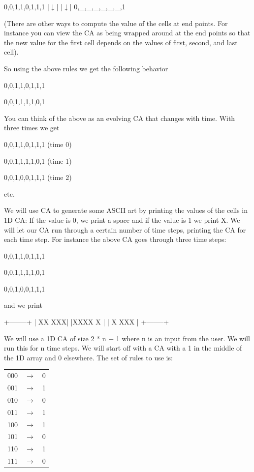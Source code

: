 \begin{consolethree}[escapeinside=||]
0,0,1,1,0,1,1,1
|$\downarrow$|             |$\downarrow$|
0,_,_,_,_,_,_,1
\end{consolethree}

(There are other ways to compute the value of the cells at end points. For instance you can view the CA as being wrapped around at the end points so that the new value for the first cell depends on the values of first, second, and last cell).

So using the above rules we get the following behavior
\begin{consolethree}[escapeinside=||]
0,0,1,1,0,1,1,1

0,0,1,1,1,1,0,1
\end{consolethree}
You can think of the above as an evolving CA that changes with time. With three times we get

\begin{center}
0,0,1,1,0,1,1,1 (time 0)

0,0,1,1,1,1,0,1 (time 1)

0,0,1,0,0,1,1,1 (time 2)
\end{center}

etc.

We will use CA to generate some ASCII art by printing the values of the cells in 1D CA: If the value is 0, we print a space and if the value is 1 we print X. We will let our CA run through a certain number of time steps, printing the CA for each time step. For instance the above CA goes through three time steps:
\begin{center}
0,0,1,1,0,1,1,1

0,0,1,1,1,1,0,1

0,0,1,0,0,1,1,1
\end{center}

and we print

\begin{consolethree}[escapeinside=||]
+--------+
|  XX XXX|
|XXXX  X |
| X  XXX |
+--------+
\end{consolethree}

We will use a 1D CA of size 2 * n + 1 where n is an input from the user. We will run this for n time steps. We will start off with a CA with a 1 in the middle of the 1D array and 0 elsewhere. The set of rules to use is:

\begin{center}
\begin{tabular}{rcl}
000 & $\rightarrow$ & 0 \\
001 & $\rightarrow$ & 1 \\
010 & $\rightarrow$ & 0 \\
011 & $\rightarrow$ & 1 \\
100 & $\rightarrow$ & 1 \\
101 & $\rightarrow$ & 0 \\
110 & $\rightarrow$ & 1 \\
111 & $\rightarrow$ & 0 \\
\end{tabular}
\end{center}

